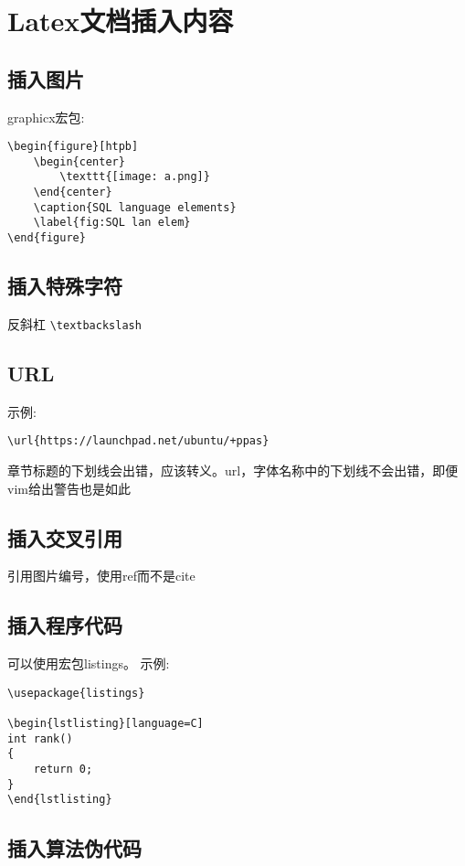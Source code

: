 
\section{Latex文档插入内容}

\subsection{插入图片}
graphicx宏包:
\begin{lstlisting}[language={[LaTex]Tex}]
\begin{figure}[htpb]
    \begin{center}
        \texttt{[image: a.png]}
    \end{center}
    \caption{SQL language elements}
    \label{fig:SQL lan elem}
\end{figure}
\end{lstlisting}


\subsection{插入特殊字符}
反斜杠 \verb+\textbackslash+

\subsection{URL}
示例:
\begin{verbatim}
\url{https://launchpad.net/ubuntu/+ppas}
\end{verbatim}
章节标题的下划线会出错，应该转义。url，字体名称中的下划线不会出错，即便vim给出警告也是如此

\subsection{插入交叉引用}
引用图片编号，使用ref而不是cite

\subsection{插入程序代码}
可以使用宏包listings。
示例:
\begin{verbatim}
\usepackage{listings} 

\begin{lstlisting}[language=C]
int rank()
{ 
    return 0;
}
\end{lstlisting}
\end{verbatim}


\subsection{插入算法伪代码}

